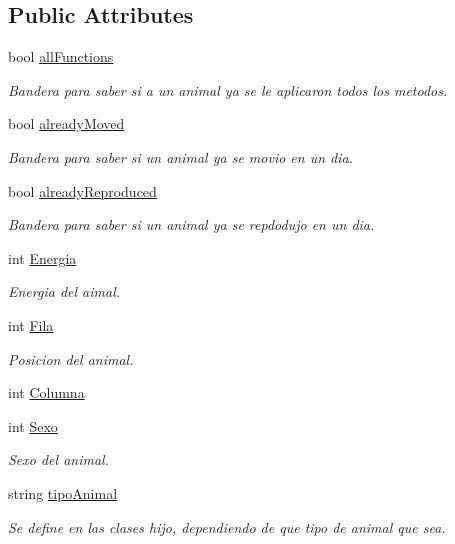 \subsection*{Public Attributes}
\begin{DoxyCompactItemize}
\item 
bool \hyperlink{classAnimal_ad014642901894565334b8d2bf3713755}{all\+Functions}
\begin{DoxyCompactList}\small\item\em Bandera para saber si a un animal ya se le aplicaron todos los metodos. \end{DoxyCompactList}\item 
bool \hyperlink{classAnimal_a1cc0126c23d1245a1f964ce636552bba}{already\+Moved}
\begin{DoxyCompactList}\small\item\em Bandera para saber si un animal ya se movio en un dia. \end{DoxyCompactList}\item 
bool \hyperlink{classAnimal_ab08fe103b56326ac66c63b0f38585c4c}{already\+Reproduced}
\begin{DoxyCompactList}\small\item\em Bandera para saber si un animal ya se repdodujo en un dia. \end{DoxyCompactList}\item 
int \hyperlink{classAnimal_af1c30573e35f61baa10094579c5e741a}{Energia}
\begin{DoxyCompactList}\small\item\em Energia del aimal. \end{DoxyCompactList}\item 
int \hyperlink{classAnimal_ab403adfd13b57143eff123bdd6a2febb}{Fila}
\begin{DoxyCompactList}\small\item\em Posicion del animal. \end{DoxyCompactList}\item 
int \hyperlink{classAnimal_a340d64e6e4ffe5f35e0855c63aad1bd3}{Columna}
\item 
int \hyperlink{classAnimal_a42b629ae5a7e0c05263a3f6e592ea116}{Sexo}
\begin{DoxyCompactList}\small\item\em Sexo del animal. \end{DoxyCompactList}\item 
string \hyperlink{classAnimal_ae7a4f121949d20c359414a3002e7eff7}{tipo\+Animal}
\begin{DoxyCompactList}\small\item\em Se define en las clases hijo, dependiendo de que tipo de animal que sea. \end{DoxyCompactList}\end{DoxyCompactItemize}


